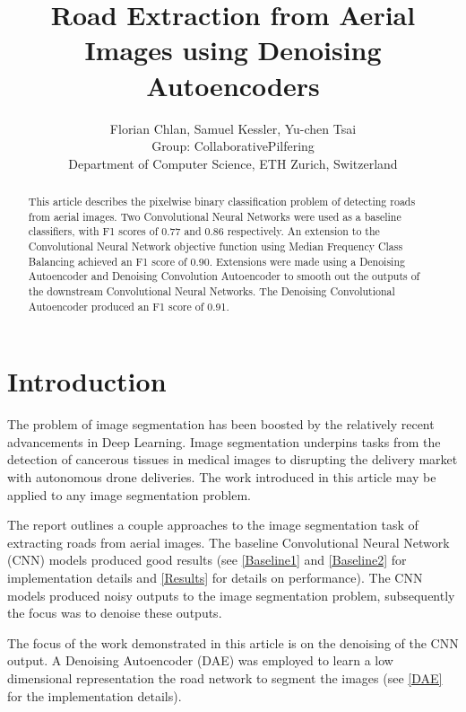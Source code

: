 \documentclass[10pt,conference,compsocconf]{IEEEtran}
\begin{document}
\title{Road Extraction from Aerial Images using Denoising Autoencoders}

\author{
  Florian Chlan, Samuel Kessler, Yu-chen Tsai\\Group: CollaborativePilfering\\
  Department of Computer Science, ETH Zurich, Switzerland
}

\maketitle

\begin{abstract}

This article describes the pixelwise binary classification problem of detecting roads from aerial images. Two Convolutional Neural Networks were used as a baseline classifiers, with F1 scores of 0.77 and 0.86 respectively. An extension to the Convolutional Neural Network objective function using Median Frequency Class Balancing achieved an F1 score of 0.90. Extensions were made using a Denoising Autoencoder and Denoising Convolution Autoencoder to smooth out the outputs of the downstream Convolutional Neural Networks. The Denoising Convolutional Autoencoder produced an F1 score of 0.91.
  
\end{abstract}

\section{Introduction}

The problem of image segmentation has been boosted by the relatively recent advancements in Deep Learning. Image segmentation underpins tasks from the detection of cancerous tissues in medical images to disrupting the delivery market with autonomous drone deliveries. The work introduced in this article may be applied to any image segmentation problem.

The report outlines a couple approaches to the image segmentation task of extracting roads from aerial images. The baseline Convolutional Neural Network (CNN) models produced good results (see \ref{Baseline1} and \ref{Baseline2} for implementation details and \ref{Results} for details on performance). The CNN models produced noisy outputs to the image segmentation problem, subsequently the focus was to denoise these outputs.

The focus of the work demonstrated in this article is on the denoising of the CNN output. A Denoising Autoencoder (DAE) was employed to learn a low dimensional representation the road network to segment the images (see \ref{DAE} for the implementation details). 
\end{document}
